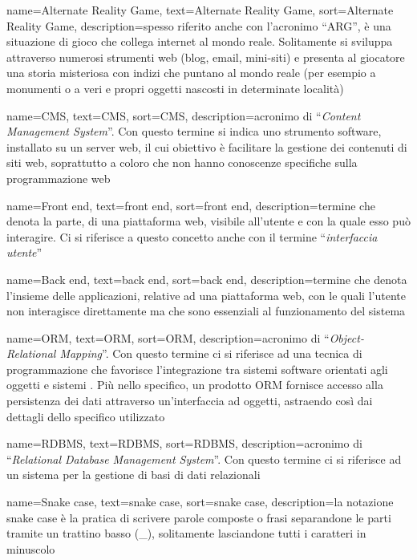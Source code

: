 {
    name=Alternate Reality Game, %
    text=Alternate Reality Game, %
    sort=Alternate Reality Game,
    description={spesso riferito anche con l’acronimo “ARG”, è una situazione di gioco che collega internet al mondo reale. Solitamente si sviluppa attraverso numerosi strumenti web (blog, email, mini-siti) e presenta al giocatore una storia misteriosa con indizi che puntano al mondo reale (per esempio a monumenti o a veri e propri oggetti nascosti in determinate località)}
}

{
    name=CMS, %
    text=CMS, %
    sort=CMS,
    description={acronimo di “\emph{Content Management System}”. Con questo termine si indica uno strumento software, installato su un server web, il cui obiettivo è facilitare la gestione dei contenuti di siti web, soprattutto a coloro che non hanno conoscenze specifiche sulla programmazione web}
}

{
    name=Front end, %
    text=front end, %
    sort=front end,
    description={termine che denota la parte, di una piattaforma web, visibile all'utente e con la quale esso può interagire. Ci si riferisce a questo concetto anche con il termine “\emph{interfaccia utente}”}
}

{
    name=Back end, %
    text=back end, %
    sort=back end,
    description={termine che denota l'insieme delle applicazioni, relative ad una piattaforma web, con le quali l'utente non interagisce direttamente ma che sono essenziali al funzionamento del sistema}
}

{
    name=ORM, %
    text=ORM, %
    sort=ORM,
    description={acronimo di “\emph{Object-Relational Mapping}”. Con questo termine ci si riferisce ad una tecnica di programmazione che favorisce l'integrazione tra sistemi software orientati agli oggetti e sistemi . Più nello specifico, un prodotto ORM fornisce accesso alla persistenza dei dati attraverso un'interfaccia ad oggetti, astraendo così dai dettagli dello specifico  utilizzato}
}

{
    name=RDBMS, %
    text=RDBMS, %
    sort=RDBMS,
    description={acronimo di “\emph{Relational Database Management System}”. Con questo termine ci si riferisce ad un sistema per la gestione di basi di dati relazionali}
}

{
    name=Snake case, %
    text=snake case, %
    sort=snake case,
    description={la notazione snake case è la pratica di scrivere parole composte o frasi separandone le parti tramite un trattino basso (\_), solitamente lasciandone tutti i caratteri in minuscolo}
}




